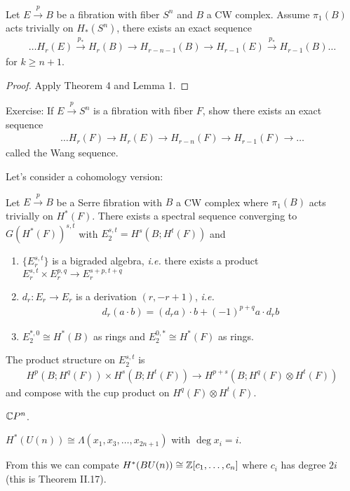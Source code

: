\documentclass[12pt,class=article,crop=false]{standalone}
\begin{document}
\begin{thm}
Let $ E \xrightarrow{ p} B $ be a fibration with fiber $ S^{n}$ and $ B$ a CW complex. Assume $ \pi_1(B)$ acts trivially on $ H_*(S^{n})$, there exists an exact sequence
\begin{align*}
	\ldots H_r(E) \xrightarrow{ p_*} H_r(B) \to H_{r-n-1} (B) \to H_{r-1} (E) \xrightarrow{ p_*} H_{r-1}(B) \ldots  
\end{align*}
for $ k \geq n+1$.
\end{thm}
\begin{proof}
Apply Theorem 4 and Lemma 1.
\end{proof}

Exercise: If $ E\xrightarrow{ p} S^{n}$ is a fibration with fiber $ F$, show there exists an exact sequence
 \begin{align*}
	\ldots H_r(F) \to H_r(E) \to H_{r-n}(F) \to H_{r-1}(F) \to\ldots
\end{align*}
called the Wang sequence.

Let's consider a cohomology version:
\begin{thm}
Let $ E\xrightarrow{ p} B$ be a Serre fibration with $ B$ a CW complex where  $ \pi_1(B)$ acts trivially on  $ H^{*}(F)$. There exists a spectral sequence converging to $ G(H^* (F))^{s,t}$ with $ E_2^{s,t} = H^{s}(B;H^{t}(F))$ and
\begin{enumerate}[label=(\arabic*)]
	\item $ \{E_r^{s,t}\} $ is a bigraded algebra, \emph{i.e.} there exists a product $ E_r^{s,t} \times E_r^{p,q} \to E_r^{s+p,t+q}$ 
	\item $ d_r: E_r \to E_r$ is a derivation $ (r,-r+1)$, \emph{i.e.}
		\begin{align*}
			d_r(a \cdot b) = (d_r a) \cdot b + (-1)^{p+q} a \cdot d_r b
		\end{align*}
	\item $ E_2^{*,0} \cong H^* (B)$ as rings and $ E_2^{0,*} \cong H^* (F)$ as rings.
\end{enumerate}
\end{thm}
\begin{remark}
The product structure on $ E_2^{s,t}$ is
\begin{align*}
	H^{p}(B; H^{q}(F)) \times H^{s}(B; H^{t}(F)) \to H^{p+s}(B; H^{q}(F) \otimes H^{t}(F))
\end{align*}
and compose with the cup product on $ H^{q}(F) \otimes H^{t}(F)$.
\end{remark}

\begin{eg}
$ \mathbb{C} P^n$.
\end{eg}
\begin{thm}
$ H^* (U(n)) \cong \Lambda (x_1,x_3,\ldots,x_{2n+1})$ with $ \deg x_i = i$.
\end{thm}
\begin{remark}
	From this we can compate $ H^* (BU(n)) \cong \mathbb{Z}[c_1,\ldots,c_n]$ where $ c_i$ has degree $ 2i$ (this is Theorem II.17).
\end{remark}
\end{document}
